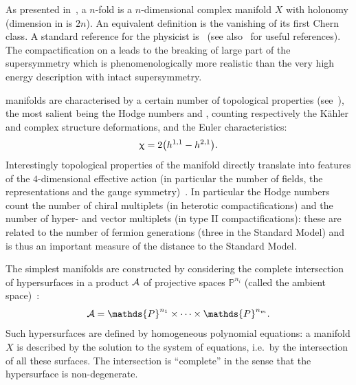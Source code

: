 As presented in~, a \cy $n$-fold is a $n$-dimensional complex manifold $X$ with  holonomy (dimension in \R is $2n$).
An equivalent definition is the vanishing of its first Chern class.
A standard reference for the physicist is~\cite{Hubsch:1992:CalabiyauManifoldsBestiary} (see also~\cite{Anderson:2018:TASILecturesGeometric} for useful references).
The compactification on a \cy leads to the breaking of large part of the supersymmetry which is phenomenologically more realistic than the very high energy description with intact supersymmetry.

\cy manifolds are characterised by a certain number of topological properties (see~), the most salient being the Hodge numbers  and , counting respectively the Kähler and complex structure deformations, and the Euler characteristics:\footnotemark{}
%
\begin{equation}
  \upchi = 2 \qty(h^{1,1} - h^{2,1}).
  \label{eq:cy:euler}
\end{equation}
Interestingly topological properties of the manifold directly translate into features of the $4$-dimensional effective action (in particular the number of fields, the representations and the gauge symmetry)~\cite{Hubsch:1992:CalabiyauManifoldsBestiary}.\footnotemark{}
In particular the Hodge numbers count the number of chiral multiplets (in heterotic compactifications) and the number of hyper- and vector multiplets (in type II compactifications): these are related to the number of fermion generations (three in the Standard Model) and is thus an important measure of the distance to the Standard Model.

The simplest \cy manifolds are constructed by considering the complete intersection of hypersurfaces in a product $\mathcal{A}$ of projective spaces $\mathds{P}^{n_i}$ (called the ambient space)~\cite{Green:1987:CalabiYauManifoldsComplete, Green:1987:PolynomialDeformationsCohomology, Candelas:1988:CompleteIntersectionCalabiYau, Green:1989:AllHodgeNumbers, Anderson:2017:FibrationsCICYThreefolds}:
\begin{equation}
  \cA = \mathds{P}^{n_1} \times \cdots \times \mathds{P}^{n_m}.
\end{equation}
Such hypersurfaces are defined by homogeneous polynomial equations: a \cicy manifold $X$ is described by the solution to the system of equations, i.e.\ by the intersection of all these surfaces.
The intersection is ``complete'' in the sense that the hypersurface is non-degenerate.


